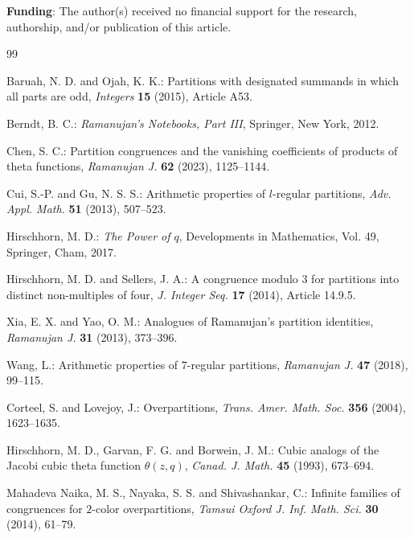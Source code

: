 \documentclass[11pt, reqno]{amsart}
\numberwithin{equation}{section}
\begin{document}
	\noindent \textbf{Funding}:
	The author(s) received no financial support for the research, authorship, and/or publication of this article.
	\begin{thebibliography}{99}
		
		Baruah, N. D. and Ojah, K. K.:
		Partitions with designated summands in which all parts are odd,
		{\em Integers} \textbf{15} (2015), Article A53.
		
		Berndt, B. C.:
		{\em Ramanujan's Notebooks, Part III},
		Springer, New York, 2012.
		
		Chen, S. C.:
		Partition congruences and the vanishing coefficients of products of
		theta functions,
		\emph{Ramanujan J.} \textbf{62} (2023), 1125--1144.
		
		Cui, S.-P. and Gu, N. S. S.:
		Arithmetic properties of $l$-regular partitions,
		{\em Adv. Appl. Math.} \textbf{51} (2013), 507--523.
		
		Hirschhorn, M. D.:
		{\em The Power of $q$},
		Developments in Mathematics, Vol. 49,
		Springer, Cham, 2017.
		
		Hirschhorn, M. D. and Sellers, J. A.:
		A congruence modulo $3$ for partitions into distinct non-multiples of four,
		{\em J. Integer Seq.} \textbf{17} (2014), Article 14.9.5.
		
		Xia, E. X. and Yao, O. M.:
		Analogues of Ramanujan's partition identities,
		{\em Ramanujan J.} \textbf{31} (2013), 373--396.
		
		Wang, L.:
		Arithmetic properties of $7$-regular partitions,
		{\em Ramanujan J.} \textbf{47} (2018), 99--115.
		
		Corteel, S. and Lovejoy, J.:
		Overpartitions,
		{\em Trans. Amer. Math. Soc.} \textbf{356} (2004), 1623--1635.
		
		Hirschhorn, M. D., Garvan, F. G. and Borwein, J. M.:
		Cubic analogs of the Jacobi cubic theta function $\theta(z,q)$,
		{\em Canad. J. Math.} \textbf{45} (1993), 673--694.
		
		Mahadeva Naika, M. S., Nayaka, S. S. and Shivashankar, C.:
		Infinite families of congruences for $2$-color overpartitions,
		{\em Tamsui Oxford J. Inf. Math. Sci.} \textbf{30} (2014), 61--79.
		
	\end{thebibliography}
\end{document}
